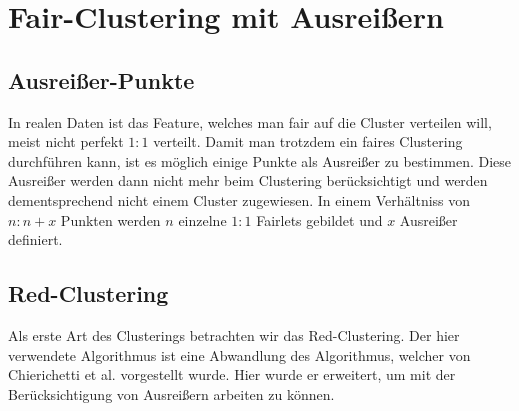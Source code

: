 \section{Fair-Clustering mit Ausreißern}
    \subsection{Ausreißer-Punkte}
    In realen Daten ist das Feature, welches man fair auf die Cluster verteilen will, meist nicht perfekt $1:1$ verteilt. Damit man trotzdem ein faires Clustering durchführen kann, ist es möglich einige Punkte als Ausreißer zu bestimmen. Diese Ausreißer werden dann nicht mehr beim Clustering berücksichtigt und werden dementsprechend nicht einem Cluster zugewiesen. \newline
    In einem Verhältniss von $n:n+x$ Punkten werden $n$ einzelne $1:1$ Fairlets gebildet und $x$ Ausreißer definiert.

    
    \subsection{Red-Clustering} \label{sec:Red-Clustering}
        Als erste Art des Clusterings betrachten wir das Red-Clustering. Der hier verwendete Algorithmus ist eine Abwandlung des Algorithmus, welcher von Chierichetti et al. \cite{chierichetti2018fair} vorgestellt wurde. Hier wurde er erweitert, um mit der Berücksichtigung von Ausreißern arbeiten zu können.

